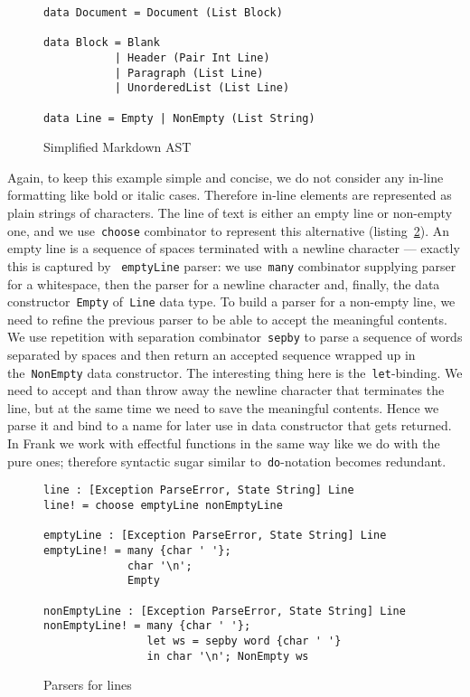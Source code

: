       \begin{figure}[h]
      \begin{lstlisting}
data Document = Document (List Block)

data Block = Blank
           | Header (Pair Int Line)
           | Paragraph (List Line)
           | UnorderedList (List Line)

data Line = Empty | NonEmpty (List String)
      \end{lstlisting}
      \caption{Simplified Markdown AST}
      \label{listing:parserMdAstCombo}
      \end{figure}

      Again, to keep this example simple and concise, we do not consider any in-line
      formatting like bold or italic cases. Therefore in-line elements are represented
      as plain strings of characters. The line of text is either an empty line or
      non-empty one, and we use~\texttt{choose} combinator to represent this
      alternative (listing~\ref{listing:parserLineCombo}). An empty line is a sequence of
      spaces terminated with a newline character --- exactly this is captured by
      ~\texttt{emptyLine} parser: we use~\texttt{many} combinator supplying parser
      for a whitespace, then the parser for a newline character and, finally, the
      data constructor~\texttt{Empty} of~\texttt{Line} data type. To build a parser for
      a non-empty line, we need to refine the previous parser to be able to accept the
      meaningful contents. We use repetition with separation combinator~\texttt{sepby}
      to parse a sequence of words separated by spaces and then return an accepted sequence
      wrapped up in the~\texttt{NonEmpty} data constructor. The interesting
      thing here is the~\texttt{let}-binding. We need to accept and than throw away
      the newline character that terminates the line, but at the same time we need to save
      the meaningful contents. Hence we parse it and bind to a name for later use in
      data constructor that gets returned. In Frank we work with
      effectful functions in the same way like we do with the pure ones; therefore
      syntactic sugar similar to~\texttt{do}-notation becomes redundant.

      \begin{figure}[h]
      \begin{lstlisting}
line : [Exception ParseError, State String] Line
line! = choose emptyLine nonEmptyLine

emptyLine : [Exception ParseError, State String] Line
emptyLine! = many {char ' '};
             char '\n';
             Empty

nonEmptyLine : [Exception ParseError, State String] Line
nonEmptyLine! = many {char ' '};
                let ws = sepby word {char ' '}
                in char '\n'; NonEmpty ws
      \end{lstlisting}
      \caption{Parsers for lines}
      \label{listing:parserLineCombo}
      \end{figure}

